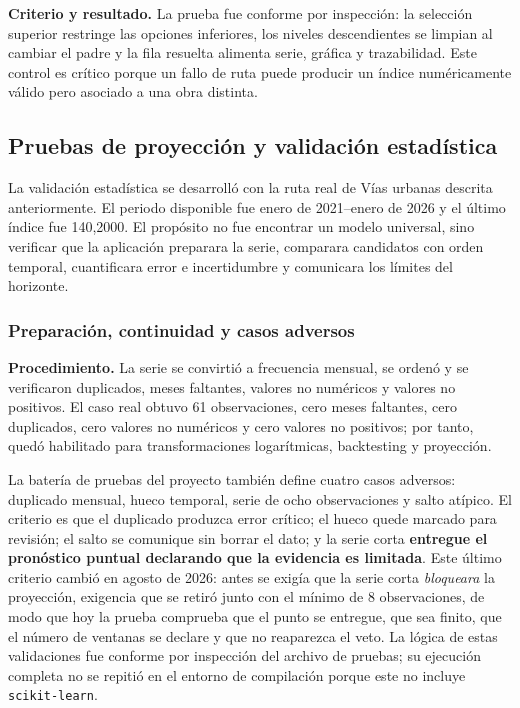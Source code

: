 \documentclass[12pt,letterpaper]{article}
\begin{document}
\textbf{Criterio y resultado.} La prueba fue conforme por inspección: la selección superior restringe las opciones inferiores, los niveles descendientes se limpian al cambiar el padre y la fila resuelta alimenta serie, gráfica y trazabilidad. Este control es crítico porque un fallo de ruta puede producir un índice numéricamente válido pero asociado a una obra distinta.

\subsection{Pruebas de proyección y validación estadística}

La validación estadística se desarrolló con la ruta real de Vías urbanas descrita anteriormente. El periodo disponible fue enero de 2021--enero de 2026 y el último índice fue 140,2000. El propósito no fue encontrar un modelo universal, sino verificar que la aplicación preparara la serie, comparara candidatos con orden temporal, cuantificara error e incertidumbre y comunicara los límites del horizonte.

\subsubsection{Preparación, continuidad y casos adversos}

\textbf{Procedimiento.} La serie se convirtió a frecuencia mensual, se ordenó y se verificaron duplicados, meses faltantes, valores no numéricos y valores no positivos. El caso real obtuvo 61 observaciones, cero meses faltantes, cero duplicados, cero valores no numéricos y cero valores no positivos; por tanto, quedó habilitado para transformaciones logarítmicas, backtesting y proyección.

La batería de pruebas del proyecto también define cuatro casos adversos: duplicado mensual, hueco temporal, serie de ocho observaciones y salto atípico. El criterio es que el duplicado produzca error crítico; el hueco quede marcado para revisión; el salto se comunique sin borrar el dato; y la serie corta \textbf{entregue el pronóstico puntual declarando que la evidencia es limitada}. Este último criterio cambió en agosto de 2026: antes se exigía que la serie corta \emph{bloqueara} la proyección, exigencia que se retiró junto con el mínimo de 8 observaciones, de modo que hoy la prueba comprueba que el punto se entregue, que sea finito, que el número de ventanas se declare y que no reaparezca el veto. La lógica de estas validaciones fue conforme por inspección del archivo de pruebas; su ejecución completa no se repitió en el entorno de compilación porque este no incluye \texttt{scikit-learn}.
\end{document}
